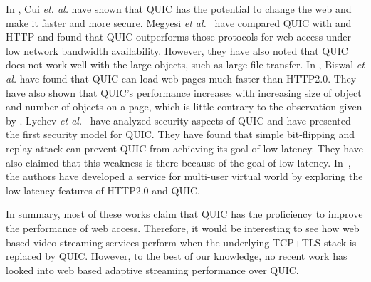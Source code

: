In \cite{Cui2017}, Cui \textit{et. al.} have shown that \ac{QUIC} has the potential to change the web and make it faster and more secure.
Megyesi \textit{et al.}~\cite{Megyesi2016} have compared \ac{QUIC} with  and \ac{HTTP} and found that \ac{QUIC} outperforms those protocols for web access under low network bandwidth availability. However, they have also noted that \ac{QUIC} does not work well with the large objects, such as large file transfer. In \cite{Biswal2016}, Biswal \textit{et al.} have found that \ac{QUIC} can load web pages much faster than HTTP2.0. They have also shown that \ac{QUIC}'s performance increases with increasing size of object and number of objects on a page, which is little contrary to the observation given by \cite{Megyesi2016}. Lychev \textit{et al.}~\cite{Lychev2015} have analyzed security aspects of QUIC and have presented the first security model for \ac{QUIC}. They have found that simple bit-flipping and replay attack can prevent \ac{QUIC} from achieving its goal of low latency. They have also claimed that this weakness is there because of the goal of low-latency. In~\cite{bakri2015http}, the authors have developed a service for multi-user virtual world by exploring the low latency features of HTTP2.0 and \ac{QUIC}.

In summary, most of these works claim that \ac{QUIC} has the proficiency to improve the performance of web access.
Therefore, it would be interesting to see how web based video streaming services perform when the underlying \ac{TCP}+\ac{TLS} stack is replaced by \ac{QUIC}. However, to the best of our knowledge, no recent work has looked into web based adaptive streaming performance over \ac{QUIC}.

